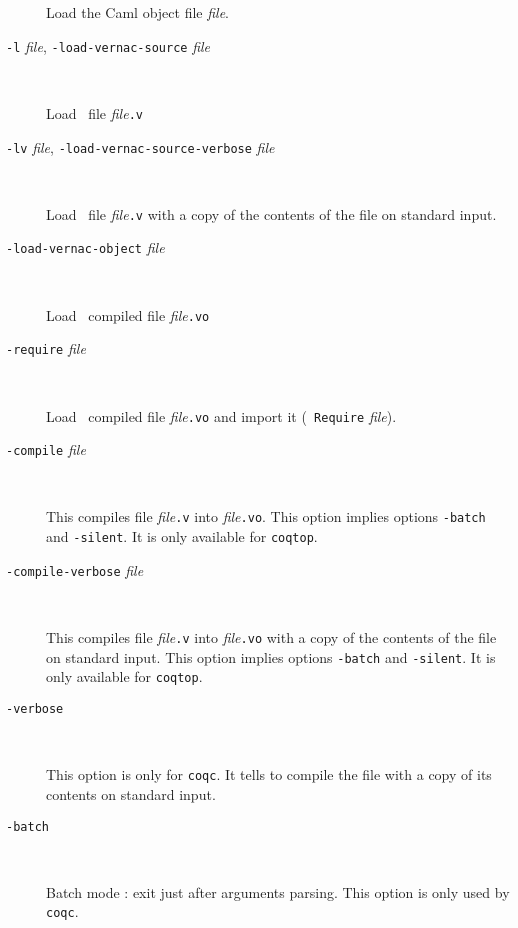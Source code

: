 \begin{description}
  Load the Caml object file {\em file}.

\item[{\tt -l} {\em file}, {\tt -load-vernac-source} {\em file}]\ 

  Load \Coq~file {\em file}{\tt .v}

\item[{\tt -lv} {\em file}, {\tt -load-vernac-source-verbose} {\em file}]\ 

  Load \Coq~file {\em file}{\tt .v} with 
  a copy of the contents of the file on standard input.

\item[{\tt -load-vernac-object} {\em file}]\ 

  Load \Coq~compiled file {\em file}{\tt .vo}

%
\item[{\tt -require} {\em file}]\ 

  Load \Coq~compiled file {\em file}{\tt .vo} and import it ({\tt
    Require} {\em file}).

\item[{\tt -compile} {\em file}]\ 

  This compiles file {\em file}{\tt .v} into {\em file}{\tt .vo}.
  This option implies options {\tt -batch} and {\tt -silent}. It is
  only available for {\tt coqtop}.

\item[{\tt -compile-verbose} {\em file}]\ 

  This compiles file {\em file}{\tt .v} into {\em file}{\tt .vo} with
  a copy of the contents of the file on standard input.
  This option implies options {\tt -batch} and {\tt -silent}. It is
  only available for {\tt coqtop}.

\item[{\tt -verbose}]\ 

  This option is only for {\tt coqc}. It tells to compile the file with
  a copy of its contents on standard input.

\item[{\tt -batch}]\ 

  Batch mode : exit just after arguments parsing. This option is only
  used by {\tt coqc}.

%


\end{description}
